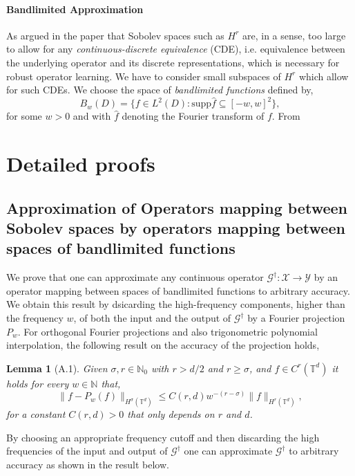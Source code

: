\documentclass[reqno,10pt]{amsart}
\theoremstyle{plain}
\newtheorem*{lem*}{Lemma}
\theoremstyle{definition}
\newcommand{\bb}[1]{\mathbb{#1}}
\newcommand{\cal}[1]{\mathcal{#1}}
\begin{document}
    \paragraph{\bf Bandlimited Approximation} As argued in the paper \cite{FB2023} that Sobolev spaces such as $H^r$ are, in a sense, too large to allow for any {\it continuous-discrete equivalence} (CDE), i.e. equivalence between the underlying operator and its discrete representations, which is necessary for robust operator learning. We have to consider small subspaces of $H^r$ which allow for such CDEs. We choose the space of {\it bandlimited functions} defined by,
    \begin{equation}
        B_w(D) = \{f \in L^2(D) : \text{supp}\hat{f} \subseteq [-w,w]^2\},
    \end{equation}
    for some $w > 0$ and with $\hat{f}$ denoting the Fourier transform of $f$. From 

    \appendix
    \section{\bf Detailed proofs} \label{appendix:A}
    \subsection[A.1]{Approximation of Operators mapping between Sobolev spaces by operators mapping between spaces of bandlimited functions}
    We prove that one can approximate any continuous operator $\cal G^\dag : \cal X \to \cal Y$ by an operator mapping between spaces of bandlimited functions to arbitrary accuracy. We obtain this result by dsicarding the high-frequency components, higher than the frequency $w$, of both the input and the output of $\cal G^\dag$ by a Fourier projection $P_w$. For orthogonal Fourier projections and also trigonometric polynomial interpolation, the following result on the accuracy of the projection holds,

    \begin{lem*}[A.1] \label{lemA1}
        Given $\sigma, r \in \bb N_0$ with $r > d/2$ and $r \geq \sigma$, and $f \in C^r(\bb T^d)$ it holds for every $w \in \bb N$ that, 
        \begin{equation}
            \|f - P_w(f)\|_{H^\sigma(\bb T^d)} \leq C(r,d)w^{-(r-\sigma)}\|f\|_{H^r(\bb T^d)},
        \end{equation}
        for a constant $C(r,d) > 0$ that only depends on $r$ and $d$.
    \end{lem*}
    By choosing an appropriate frequency cutoff and then discarding the high frequencies of the input and output of $\cal G^\dag$ one can approximate $\cal G^\dag$ to arbitrary accuracy as shown in the result below.
    
\end{document}
